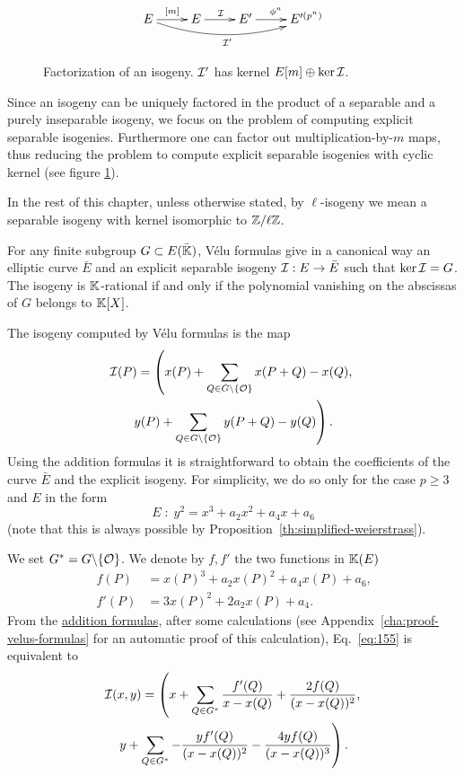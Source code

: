 \begin{figure}
  \centering
  \[\xymatrix{
    E \ar[r]^{[m]}\ar@/_1pc/[rrr]_{\I'} & E \ar[r]^\I & E' \ar[r]^{\frobisog^n} & E'^{(p^n)}\\
  }\]
  \label{fig:fact}
  \caption{Factorization of an isogeny. $\mathcal{I}'$ has kernel $E[m]\oplus\ker\mathcal{I}$.}
\end{figure}

Since an isogeny can be uniquely factored in the product of a
separable and a purely inseparable isogeny, we focus on the problem of
computing explicit separable isogenies. Furthermore one can factor out
multiplication-by-$m$ maps, thus reducing the problem to compute
explicit separable isogenies with cyclic kernel (see figure
\ref{fig:fact}).

In the rest of this chapter, unless otherwise stated, by
$\ell$-isogeny we mean a separable isogeny with kernel isomorphic to
$\mathbb{Z}/\ell\mathbb{Z}$.


For any finite subgroup $G \subset E(\bar{\mathbb{K}})$, Vélu formulas
\cite{velu71} give in a canonical way an elliptic curve $\bar{E}$ and
an explicit separable isogeny $\mathcal{I}:E\rightarrow \bar{E}$ such that
$\ker\mathcal{I}=G$. The isogeny is $\mathbb{K}$-rational if and only if the polynomial
vanishing on the abscissas of $G$ belongs to $\mathbb{K}[X]$.

The isogeny computed by Vélu formulas is the map
\begin{multline}
  \label{eq:155}
  \mathcal{I}(P) = \left(x(P) + \sum_{Q\in G\backslash\{\mathcal{O}\}}x(P+Q) - x(Q),\right.\\
    \left.y(P) + \sum_{Q\in G\backslash\{\mathcal{O}\}}y(P+Q) - y(Q)\right)
  \text{.}
\end{multline}
Using the addition formulas it is straightforward to obtain the
coefficients of the curve $\bar{E}$ and the explicit isogeny.  For
simplicity, we do so only for the case $p\ge3$ and $E$ in the form
\begin{equation}
  \label{eq:160}
  E \;:\; y^2 =  x^3 + a_2x^2 + a_4x + a_6
\end{equation}
(note that this is always possible by
Proposition~\ref{th:simplified-weierstrass}). 

We set $G^\ast=G\backslash\{\mathcal{O}\}$. We denote by $f,f'$ the two
functions in $\mathbb{K}(E)$
\begin{equation}
  \label{eq:162}
  \begin{aligned}
    f(P) &= x(P)^3 + a_2x(P)^2 + a_4x(P) + a_6
    \text{,}\\
    f'(P) &= 3x(P)^2 + 2a_2x(P) + a_4
    \text{.}
  \end{aligned}
\end{equation}
From the \hyperref[eq:121]{addition formulas}, after some calculations
(see Appendix~\ref{cha:proof-velus-formulas} for an automatic proof of
this calculation), Eq.~\eqref{eq:155} is equivalent to
\begin{multline}
  \label{eq:161}
  \mathcal{I}(x,y) = \left(x + \sum_{Q\in G^\ast} \frac{f'(Q)}{x-x(Q)} + \frac{2f(Q)}{(x-x(Q))^2}\text{,}\right.\\
  \left.y + \sum_{Q\in G^\ast} -\frac{yf'(Q)}{(x-x(Q))^2} - \frac{4yf(Q)}{(x-x(Q))^3}\right)
  \text{.}
\end{multline}

